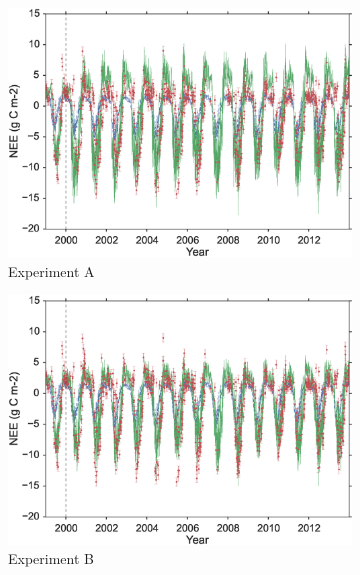 \documentclass[11pt]{article}
\begin{document}
\begin{figure}
    \centering
    \begin{subfigure}[b]{0.49\textwidth}
        \includegraphics[width=\textwidth]{A4dvar.eps}
        \caption{Experiment A}
        \label{fig:4dvardiagBR}
    \end{subfigure}
    \begin{subfigure}[b]{0.49\textwidth}
        \includegraphics[width=\textwidth]{B4dvar.eps}
        \caption{Experiment B}
        \label{fig:4dvaredcBR}
    \end{subfigure}
    \begin{subfigure}[b]{0.49\textwidth}

\end{subfigure}
\end{figure}
\end{document}

